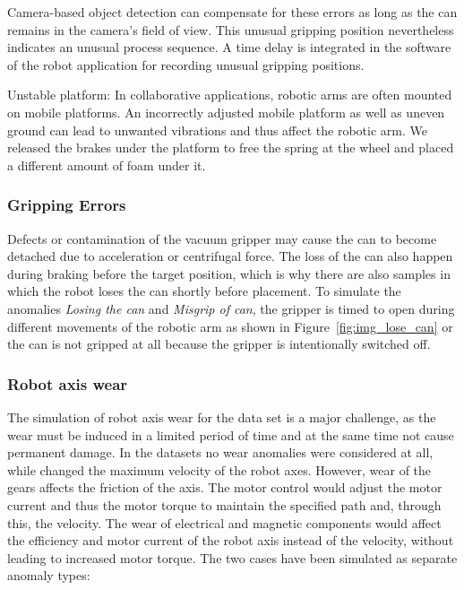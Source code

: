 \documentclass[journal]{IEEEtran}
\newenvironment{packed_enum}{
\begin{itemize}
  \setlength{\itemsep}{3pt}
  \setlength{\parskip}{0pt}
  \setlength{\parsep}{0pt}
}{\end{itemize}}
\begin{document}
\begin{packed_enum}
    Camera-based object detection can compensate for these errors as long as the can remains in the camera's field of view.
    This unusual gripping position nevertheless indicates an unusual process sequence.
    A time delay is integrated in the software of the robot application for recording unusual gripping positions.
    \item Unstable platform:
    In collaborative applications, robotic arms are often mounted on mobile platforms.
    An incorrectly adjusted mobile platform as well as uneven ground can lead to unwanted vibrations and thus affect the robotic arm.
    {We released the brakes under the platform to free the spring at the wheel and placed a different amount of foam under it.}
\end{packed_enum}

\subsubsection{Gripping Errors} 
Defects or contamination of the vacuum gripper may cause the can to become detached due to acceleration or centrifugal force. The loss of the can also happen during braking before the target position, which is why there are also samples in which the robot loses the can shortly before placement. To simulate the anomalies \textit{Losing the can} and \textit{Misgrip of can}, the gripper is timed to open during different movements of the robotic arm as shown in Figure~\ref{fig:img_lose_can} or the can is not gripped at all because the gripper is intentionally switched off. 

\subsubsection{Robot axis wear}
{The simulation of robot axis wear for the data set is a major challenge, as the wear must be induced in a limited period of time and at the same time not cause permanent damage.
In the datasets \cite{swvae, rnn_vae, zhang2021robot, aursad} no wear anomalies were considered at all, while \cite{hornung2014model} changed the maximum velocity of the robot axes.
However, wear of the gears affects the friction of the axis.
The motor control would adjust the motor current and thus the motor torque to maintain the specified path and, through this, the velocity. 
The wear of electrical and magnetic components would affect the efficiency and motor current of the robot axis instead of the velocity, without leading to increased motor torque.
The two cases have been simulated as separate anomaly types:}
\end{document}
